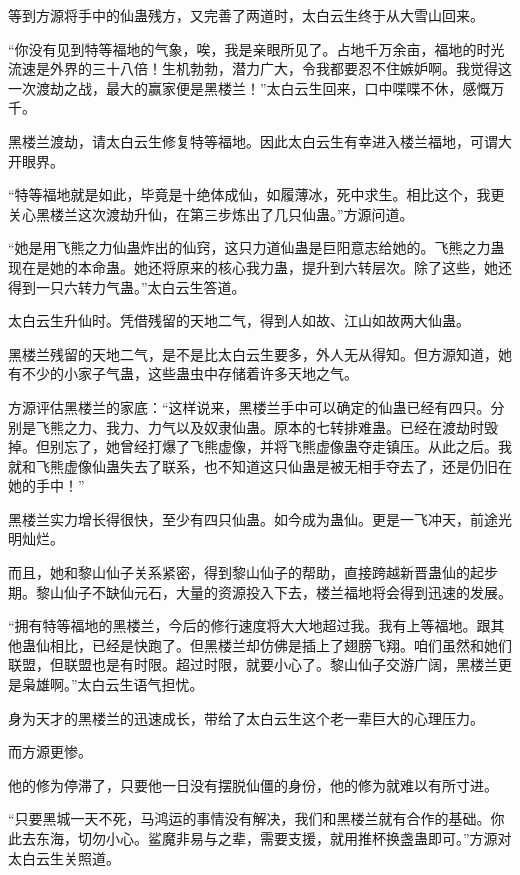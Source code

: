\begin{this_body}
等到方源将手中的仙蛊残方，又完善了两道时，太白云生终于从大雪山回来。

“你没有见到特等福地的气象，唉，我是亲眼所见了。占地千万余亩，福地的时光流速是外界的三十八倍！生机勃勃，潜力广大，令我都要忍不住嫉妒啊。我觉得这一次渡劫之战，最大的赢家便是黑楼兰！”太白云生回来，口中喋喋不休，感慨万千。

黑楼兰渡劫，请太白云生修复特等福地。因此太白云生有幸进入楼兰福地，可谓大开眼界。

“特等福地就是如此，毕竟是十绝体成仙，如履薄冰，死中求生。相比这个，我更关心黑楼兰这次渡劫升仙，在第三步炼出了几只仙蛊。”方源问道。

“她是用飞熊之力仙蛊炸出的仙窍，这只力道仙蛊是巨阳意志给她的。飞熊之力蛊现在是她的本命蛊。她还将原来的核心我力蛊，提升到六转层次。除了这些，她还得到一只六转力气蛊。”太白云生答道。

太白云生升仙时。凭借残留的天地二气，得到人如故、江山如故两大仙蛊。

黑楼兰残留的天地二气，是不是比太白云生要多，外人无从得知。但方源知道，她有不少的小家子气蛊，这些蛊虫中存储着许多天地之气。

方源评估黑楼兰的家底：“这样说来，黑楼兰手中可以确定的仙蛊已经有四只。分别是飞熊之力、我力、力气以及奴隶仙蛊。原本的七转排难蛊。已经在渡劫时毁掉。但别忘了，她曾经打爆了飞熊虚像，并将飞熊虚像蛊夺走镇压。从此之后。我就和飞熊虚像仙蛊失去了联系，也不知道这只仙蛊是被无相手夺去了，还是仍旧在她的手中！”

黑楼兰实力增长得很快，至少有四只仙蛊。如今成为蛊仙。更是一飞冲天，前途光明灿烂。

而且，她和黎山仙子关系紧密，得到黎山仙子的帮助，直接跨越新晋蛊仙的起步期。黎山仙子不缺仙元石，大量的资源投入下去，楼兰福地将会得到迅速的发展。

“拥有特等福地的黑楼兰，今后的修行速度将大大地超过我。我有上等福地。跟其他蛊仙相比，已经是快跑了。但黑楼兰却仿佛是插上了翅膀飞翔。咱们虽然和她们联盟，但联盟也是有时限。超过时限，就要小心了。黎山仙子交游广阔，黑楼兰更是枭雄啊。”太白云生语气担忧。

身为天才的黑楼兰的迅速成长，带给了太白云生这个老一辈巨大的心理压力。

而方源更惨。

他的修为停滞了，只要他一日没有摆脱仙僵的身份，他的修为就难以有所寸进。

“只要黑城一天不死，马鸿运的事情没有解决，我们和黑楼兰就有合作的基础。你此去东海，切勿小心。鲨魔非易与之辈，需要支援，就用推杯换盏蛊即可。”方源对太白云生关照道。


\end{this_body}
